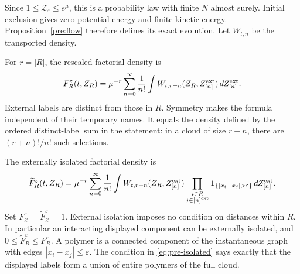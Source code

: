 Since $1\leq\mathcal Z_\varepsilon\leq e^\mu$, this is a probability law
with finite $N$ almost surely. Initial exclusion gives zero potential
energy and finite kinetic energy. Proposition~\ref{pre:flow} therefore
defines its exact evolution. Let $W_{t,n}$ be the transported density.

For $r=|R|$, the rescaled factorial density is
\begin{equation}\label{pre:factorial}
 F_R^\varepsilon(t,Z_R)=
 \mu^{-r}\sum_{n=0}^\infty\frac1{n!}
       \int W_{t,r+n}(Z_R,Z_{[n]}^{\rm ext})\,dZ_{[n]}^{\rm ext}.
\end{equation}
External labels are distinct from those in $R$.
Symmetry makes the formula independent of their temporary names.
It equals the density defined by the ordered distinct-label sum in the
statement: in a cloud of size $r+n$, there are $(r+n)!/n!$ such selections.

The externally isolated factorial density is
\begin{equation}\label{eq:pre-isolated}
 \widetilde F_R^\varepsilon(t,Z_R)=
 \mu^{-r}\sum_{n=0}^\infty\frac1{n!}
 \int W_{t,r+n}(Z_R,Z_{[n]}^{\rm ext})
 \prod_{\substack{i\in R\\j\in[n]^{\rm ext}}}
       \mathbf1_{\{|x_i-x_j|>\varepsilon\}}\,
             dZ_{[n]}^{\rm ext}.
\end{equation}
Set $F_\varnothing^\varepsilon=\widetilde F_\varnothing^\varepsilon=1$.
External isolation imposes no condition on distances within $R$.
In particular an interacting displayed component can be externally
isolated, and $0\leq\widetilde F_R^\varepsilon\leq F_R^\varepsilon$.
A polymer is a connected component of the instantaneous graph with
edges $|x_i-x_j|\leq\varepsilon$.
The condition in \eqref{eq:pre-isolated} says exactly that the displayed
labels form a union of entire polymers of the full cloud.

